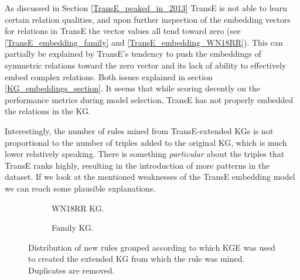 As discussed in Section \ref{TransE_peaked_in_2013} TransE is not able to learn certain relation qualities, and upon further inspection of the embedding vectors for relations in TransE the vector values all tend toward zero (see \ref{TransE_embedding_family} and \ref{TransE_embedding_WN18RR}). This can partially be explained by TransE's tendency to push the embeddings of symmetric relations toward the zero vector and its lack of ability to effectively embed complex relations. Both issues explained in section \ref{KG_embeddings_section}. It seems that while scoring decently on the performance metrics during model selection, TransE has not properly embedded the relations in the KG. 

Interestingly, the number of rules mined from TransE-extended KGs is not proportional to the number of triples added to the original KG, which is much lower relatively speaking. There is something \textit{particular} about the triples that TransE ranks highly, resulting in the introduction of more patterns in the dataset. If we look at the mentioned weaknesses of the TransE embedding model we can reach some plausible explanations.

\begin{figure}[htb]
\centering
\begin{subfigure}{.5\textwidth}
  \centering
  
  \caption{WN18RR KG.}
  \label{venn_wn18rr}
\end{subfigure}%
\begin{subfigure}{.5\textwidth}
  \centering
  
  \caption{Family KG.}
  \label{venn_family}
\end{subfigure}
\caption[New rules grouped by KGEs]{Distribution of new rules grouped according to which KGE was used to created the extended KG from which the rule was mined. Duplicates are removed.}
\label{venn}
\end{figure}

